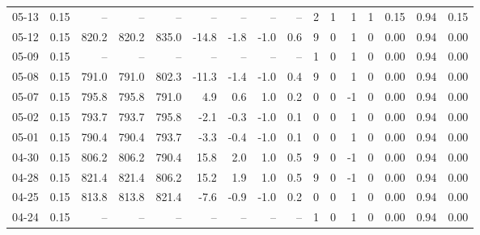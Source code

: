 \begin{threeparttable}
{\begin{tabular}{lrrrrrrrrrrrrrrr}
  05-13 &     0.15 &    -- &    -- &    -- &         -- &             -- &                       -- &                  -- &              2 &         1 &     1 &         1 &       0.15 &      0.94 &           0.15 \\
  05-12 &     0.15 & 820.2 & 820.2 & 835.0 &      -14.8 &           -1.8 &                     -1.0 &                 0.6 &              9 &         0 &     1 &         0 &       0.00 &      0.94 &           0.00 \\
  05-09 &     0.15 &    -- &    -- &    -- &         -- &             -- &                       -- &                  -- &              1 &         0 &     1 &         0 &       0.00 &      0.94 &           0.00 \\
  05-08 &     0.15 & 791.0 & 791.0 & 802.3 &      -11.3 &           -1.4 &                     -1.0 &                 0.4 &              9 &         0 &     1 &         0 &       0.00 &      0.94 &           0.00 \\
  05-07 &     0.15 & 795.8 & 795.8 & 791.0 &        4.9 &            0.6 &                      1.0 &                 0.2 &              0 &         0 &    -1 &         0 &       0.00 &      0.94 &           0.00 \\
  05-02 &     0.15 & 793.7 & 793.7 & 795.8 &       -2.1 &           -0.3 &                     -1.0 &                 0.1 &              0 &         0 &     1 &         0 &       0.00 &      0.94 &           0.00 \\
  05-01 &     0.15 & 790.4 & 790.4 & 793.7 &       -3.3 &           -0.4 &                     -1.0 &                 0.1 &              0 &         0 &     1 &         0 &       0.00 &      0.94 &           0.00 \\
  04-30 &     0.15 & 806.2 & 806.2 & 790.4 &       15.8 &            2.0 &                      1.0 &                 0.5 &              9 &         0 &    -1 &         0 &       0.00 &      0.94 &           0.00 \\
  04-28 &     0.15 & 821.4 & 821.4 & 806.2 &       15.2 &            1.9 &                      1.0 &                 0.5 &              9 &         0 &    -1 &         0 &       0.00 &      0.94 &           0.00 \\
  04-25 &     0.15 & 813.8 & 813.8 & 821.4 &       -7.6 &           -0.9 &                     -1.0 &                 0.2 &              0 &         0 &     1 &         0 &       0.00 &      0.94 &           0.00 \\
  04-24 &     0.15 &    -- &    -- &    -- &         -- &             -- &                       -- &                  -- &              1 &         0 &     1 &         0 &       0.00 &      0.94 &           0.00 \\

\end{tabular}}
\end{threeparttable}
